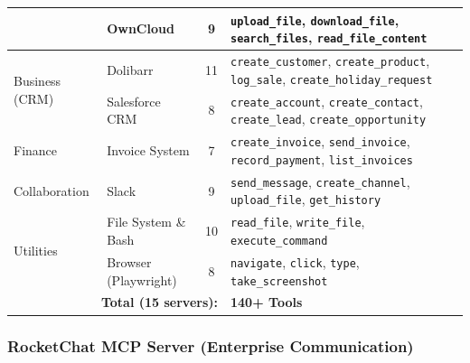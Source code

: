 \documentclass{article}
\theoremstyle{plain}
\theoremstyle{definition}
\theoremstyle{remark}
\begin{document}
\begin{table}[t]
{\begin{tabular}{llc p{7cm}}
        & OwnCloud & 9 & \texttt{upload\_file}, \texttt{download\_file}, \texttt{search\_files}, \texttt{read\_file\_content} \\
        \midrule
        \multirow{2}{*}{Business (CRM)} & Dolibarr & 11 & \texttt{create\_customer}, \texttt{create\_product}, \texttt{log\_sale}, \texttt{create\_holiday\_request} \\
        & Salesforce CRM & 8 & \texttt{create\_account}, \texttt{create\_contact}, \texttt{create\_lead}, \texttt{create\_opportunity} \\
        \midrule
        Finance & Invoice System & 7 & \texttt{create\_invoice}, \texttt{send\_invoice}, \texttt{record\_payment}, \texttt{list\_invoices} \\
        \midrule
        Collaboration & Slack & 9 & \texttt{send\_message}, \texttt{create\_channel}, \texttt{upload\_file}, \texttt{get\_history} \\
        \midrule
        \multirow{2}{*}{Utilities} & File System \& Bash & 10 & \texttt{read\_file}, \texttt{write\_file}, \texttt{execute\_command} \\
        & Browser (Playwright) & 8 & \texttt{navigate}, \texttt{click}, \texttt{type}, \texttt{take\_screenshot} \\
        \bottomrule
        \multicolumn{3}{r}{\textbf{Total (15 servers):}} & \textbf{140+ Tools} \\
    \end{tabular}
    }
\end{table}



\subsubsection{RocketChat MCP Server (Enterprise Communication)}
\end{document}
